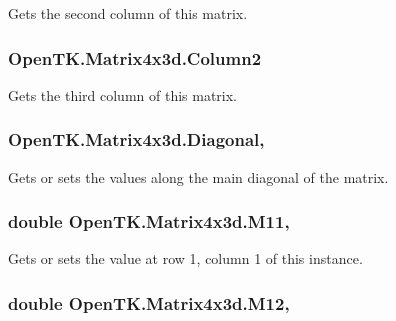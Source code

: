 Gets the second column of this matrix. 

\hypertarget{struct_open_t_k_1_1_matrix4x3d_a00aba45e803306f9a3930bb9b8aba482}{
\subsubsection[{Column2}]{ Open\-T\-K.\-Matrix4x3d.\-Column2\hspace{0.3cm}{\ttfamily [get]}}}\label{struct_open_t_k_1_1_matrix4x3d_a00aba45e803306f9a3930bb9b8aba482}


Gets the third column of this matrix. 

\hypertarget{struct_open_t_k_1_1_matrix4x3d_a516d7a3e891262f6cf1406b615619cb4}{
\subsubsection[{Diagonal}]{ Open\-T\-K.\-Matrix4x3d.\-Diagonal\hspace{0.3cm}{\ttfamily [get]}, {\ttfamily [set]}}}\label{struct_open_t_k_1_1_matrix4x3d_a516d7a3e891262f6cf1406b615619cb4}


Gets or sets the values along the main diagonal of the matrix. 

\hypertarget{struct_open_t_k_1_1_matrix4x3d_acb1232a95cd41fbdeacdae7605a86f6b}{
\subsubsection[{M11}]{\setlength{\rightskip}{0pt plus 5cm}double Open\-T\-K.\-Matrix4x3d.\-M11\hspace{0.3cm}{\ttfamily [get]}, {\ttfamily [set]}}}\label{struct_open_t_k_1_1_matrix4x3d_acb1232a95cd41fbdeacdae7605a86f6b}


Gets or sets the value at row 1, column 1 of this instance. 

\hypertarget{struct_open_t_k_1_1_matrix4x3d_a264e44960b59c15bd8db422a71a216bf}{
\subsubsection[{M12}]{\setlength{\rightskip}{0pt plus 5cm}double Open\-T\-K.\-Matrix4x3d.\-M12\hspace{0.3cm}{\ttfamily [get]}, {\ttfamily [set]}}}\label{struct_open_t_k_1_1_matrix4x3d_a264e44960b59c15bd8db422a71a216bf}


